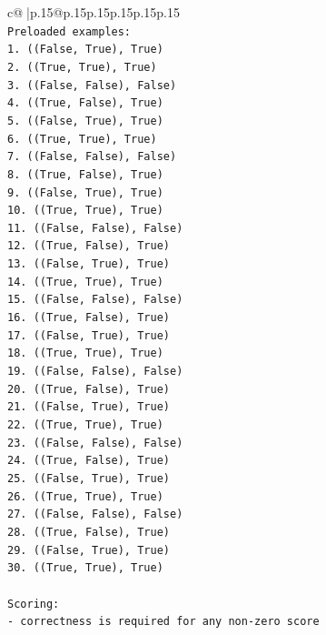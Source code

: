 \documentclass{article}
\begin{document}
{\begin{supertabular}{c@{$\;$}|p{.15\linewidth}@{}p{.15\linewidth}p{.15\linewidth}p{.15\linewidth}p{.15\linewidth}p{.15\linewidth}}
{{{\\ 
\texttt{Preloaded examples:} \\
\texttt{1. ((False, True), True)} \\
\texttt{2. ((True, True), True)} \\
\texttt{3. ((False, False), False)} \\
\texttt{4. ((True, False), True)} \\
\texttt{5. ((False, True), True)} \\
\texttt{6. ((True, True), True)} \\
\texttt{7. ((False, False), False)} \\
\texttt{8. ((True, False), True)} \\
\texttt{9. ((False, True), True)} \\
\texttt{10. ((True, True), True)} \\
\texttt{11. ((False, False), False)} \\
\texttt{12. ((True, False), True)} \\
\texttt{13. ((False, True), True)} \\
\texttt{14. ((True, True), True)} \\
\texttt{15. ((False, False), False)} \\
\texttt{16. ((True, False), True)} \\
\texttt{17. ((False, True), True)} \\
\texttt{18. ((True, True), True)} \\
\texttt{19. ((False, False), False)} \\
\texttt{20. ((True, False), True)} \\
\texttt{21. ((False, True), True)} \\
\texttt{22. ((True, True), True)} \\
\texttt{23. ((False, False), False)} \\
\texttt{24. ((True, False), True)} \\
\texttt{25. ((False, True), True)} \\
\texttt{26. ((True, True), True)} \\
\texttt{27. ((False, False), False)} \\
\texttt{28. ((True, False), True)} \\
\texttt{29. ((False, True), True)} \\
\texttt{30. ((True, True), True)} \\
\\ 
\texttt{Scoring:} \\
\texttt{{-} correctness is required for any non{-}zero score} \\
}}}
\end{supertabular}}
\end{document}
